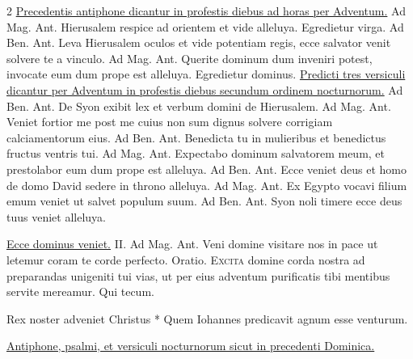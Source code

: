 \begin{multicols*}{2}
\newline \ul{Precedentis antiphone dicantur in profestis diebus ad horas per Adventum.} {\color{Red} Ad Mag. Ant.} Hierusalem respice ad orientem et vide alleluya.
 \V Egredietur virga. {\color{Red} Ad Ben. Ant.} Leva Hierusalem oculos et vide potentiam regis, ecce salvator venit solvere te a vinculo. {\color{Red} Ad Mag. Ant.} Querite dominum dum inveniri potest, invocate eum dum prope est alleluya.
 \V Egredietur dominus. 
\newline \ul{Predicti tres versiculi dicantur per Adventum in profestis diebus secundum ordinem nocturnorum.} {\color{Red} Ad Ben. Ant.} De Syon exibit lex et verbum domini de Hierusalem. {\color{Red} Ad Mag. Ant.} Veniet fortior me post me cuius non sum dignus solvere corrigiam calciamentorum eius.
 {\color{Red} Ad Ben. Ant.} Benedicta tu in mulieribus et benedictus fructus ventris tui. {\color{Red} Ad Mag. Ant.} Expectabo dominum salvatorem meum, et prestolabor eum dum prope est alleluya.
 {\color{Red} Ad Ben. Ant.} Ecce veniet deus et homo de domo David sedere in throno alleluya. {\color{Red} Ad Mag. Ant.} Ex Egypto vocavi filium emum veniet ut salvet populum suum.
 {\color{Red} Ad Ben. Ant.} Syon noli timere ecce deus tuus veniet alleluya.
{\color{Red} }
\par {} \R \hyperlink{ecce-dominus-veniet}{Ecce dominus veniet.} {\color{Red} II. Ad Mag. Ant.} Veni domine visitare nos in pace ut letemur coram te corde perfecto. {\color{Red} Oratio.}
\lettrine[lines=2]{\zallmancaps \color{Red} E}{xcita} domine corda nostra ad preparandas unigeniti tui vias, ut per eius adventum purificatis tibi mentibus servite mereamur. Qui tecum.
\begin{invitatory}
{Rex noster adveniet Christus * Quem Iohannes predicavit agnum esse venturum.}
\end{invitatory}
\newline \ul{Antiphone, psalmi, et versiculi nocturnorum sicut in precedenti Dominica.}

\end{multicols*}
